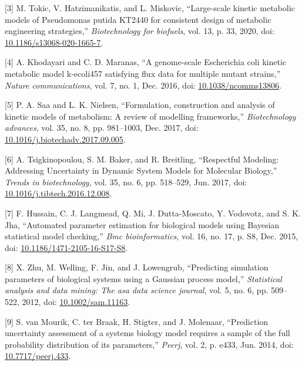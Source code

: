 \documentclass[11pt]{article}
\begin{document}
\hypertarget{citeproc_bib_item_3}{[3] M. Tokic, V. Hatzimanikatis, and L. Miskovic, “Large-scale kinetic metabolic models of Pseudomonas putida KT2440 for consistent design of metabolic engineering strategies,” \textit{Biotechnology for biofuels}, vol. 13, p. 33, 2020, doi: \href{https://doi.org/10.1186/s13068-020-1665-7}{10.1186/s13068-020-1665-7}.}

\hypertarget{citeproc_bib_item_4}{[4] A. Khodayari and C. D. Maranas, “A genome-scale Escherichia coli kinetic metabolic model k-ecoli457 satisfying flux data for multiple mutant strains,” \textit{Nature communications}, vol. 7, no. 1, Dec. 2016, doi: \href{https://doi.org/10.1038/ncomms13806}{10.1038/ncomms13806}.}

\hypertarget{citeproc_bib_item_5}{[5] P. A. Saa and L. K. Nielsen, “Formulation, construction and analysis of kinetic models of metabolism: A review of modelling frameworks,” \textit{Biotechnology advances}, vol. 35, no. 8, pp. 981–1003, Dec. 2017, doi: \href{https://doi.org/10.1016/j.biotechadv.2017.09.005}{10.1016/j.biotechadv.2017.09.005}.}

\hypertarget{citeproc_bib_item_6}{[6] A. Tsigkinopoulou, S. M. Baker, and R. Breitling, “Respectful Modeling: Addressing Uncertainty in Dynamic System Models for Molecular Biology,” \textit{Trends in biotechnology}, vol. 35, no. 6, pp. 518–529, Jun. 2017, doi: \href{https://doi.org/10.1016/j.tibtech.2016.12.008}{10.1016/j.tibtech.2016.12.008}.}

\hypertarget{citeproc_bib_item_7}{[7] F. Hussain, C. J. Langmead, Q. Mi, J. Dutta-Moscato, Y. Vodovotz, and S. K. Jha, “Automated parameter estimation for biological models using Bayesian statistical model checking,” \textit{Bmc bioinformatics}, vol. 16, no. 17, p. S8, Dec. 2015, doi: \href{https://doi.org/10.1186/1471-2105-16-S17-S8}{10.1186/1471-2105-16-S17-S8}.}

\hypertarget{citeproc_bib_item_8}{[8] X. Zhu, M. Welling, F. Jin, and J. Lowengrub, “Predicting simulation parameters of biological systems using a Gaussian process model,” \textit{Statistical analysis and data mining: The asa data science journal}, vol. 5, no. 6, pp. 509–522, 2012, doi: \href{https://doi.org/10.1002/sam.11163}{10.1002/sam.11163}.}

\hypertarget{citeproc_bib_item_9}{[9] S. van Mourik, C. ter Braak, H. Stigter, and J. Molenaar, “Prediction uncertainty assessment of a systems biology model requires a sample of the full probability distribution of its parameters,” \textit{Peerj}, vol. 2, p. e433, Jun. 2014, doi: \href{https://doi.org/10.7717/peerj.433}{10.7717/peerj.433}.}
\end{document}
